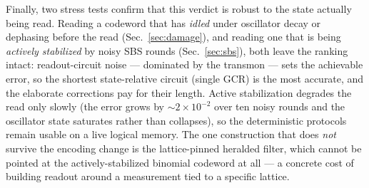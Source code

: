 \documentclass[11pt]{article}
\begin{document}
Finally, two stress tests confirm that this verdict is robust to the state actually being read.
Reading a codeword that has \emph{idled} under oscillator decay or dephasing before the read
(Sec.~\ref{sec:damage}), and reading one that is being \emph{actively stabilized} by noisy SBS rounds
(Sec.~\ref{sec:sbs}), both leave the ranking intact: readout-circuit noise --- dominated by the
transmon --- sets the achievable error, so the shortest state-relative circuit (single GCR) is the most
accurate, and the elaborate corrections pay for their length. Active stabilization degrades the read
only slowly (the error grows by $\sim\!2\times10^{-2}$ over ten noisy rounds and the oscillator state
saturates rather than collapses), so the deterministic protocols remain usable on a live logical memory.
The one construction that does \emph{not} survive the encoding change is the lattice-pinned heralded
filter, which cannot be pointed at the actively-stabilized binomial codeword at all --- a concrete cost
of building readout around a measurement tied to a specific lattice.
\end{document}
